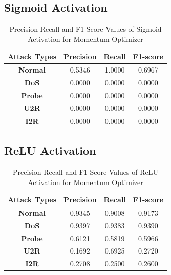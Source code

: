 \documentclass[12pt, a4paper]{report}
\begin{document}
\begin{appendices}
	 \subsection{Sigmoid Activation}
   	\begin{table}[h]
	\centering
	\captionsetup{justification=centering,margin=2cm}
	\begin{tabular}{|c|c|c|c|}
	\hline
	\textbf{Attack Types} & \textbf{Precision} & \textbf{Recall} & \textbf{F1-score} \\ \hline
	\textbf{Normal}       & 0.5346             & 1.0000          & 0.6967            \\ \hline
	\textbf{DoS}          & 0.0000             & 0.0000          & 0.0000            \\ \hline
	\textbf{Probe}        & 0.0000             & 0.0000          & 0.0000            \\ \hline
	\textbf{U2R}          & 0.0000             & 0.0000          & 0.0000            \\ \hline
	\textbf{I2R}          & 0.0000             & 0.0000          & 0.0000            \\ \hline
	\end{tabular}
	\caption{Precision Recall and F1-Score Values of Sigmoid Activation for Momentum Optimizer}
	\label{classification sigmoid Momentum tflearn}
	\end{table} 
	
	\subsection{ReLU Activation}
	 \begin{table}[h]
		\centering
		\captionsetup{justification=centering,margin=2cm}
		\begin{tabular}{|c|c|c|c|}
		\hline
		\textbf{Attack Types} & \textbf{Precision} & \textbf{Recall} & \textbf{F1-score} \\ \hline
		\textbf{Normal}       & 0.9345             & 0.9008          & 0.9173            \\ \hline
		\textbf{DoS}          & 0.9397             & 0.9383          & 0.9390            \\ \hline
		\textbf{Probe}        & 0.6121             & 0.5819          & 0.5966            \\ \hline
		\textbf{U2R}          & 0.1692             & 0.6925          & 0.2720            \\ \hline
		\textbf{I2R}          & 0.2708             & 0.2500          & 0.2600            \\ \hline
		\end{tabular}
		\caption{Precision Recall and F1-Score Values of ReLU Activation for Momentum Optimizer}
		\label{classification relu Momentum tflearn}
		\end{table} 
	\clearpage

\end{appendices}
\end{document}
